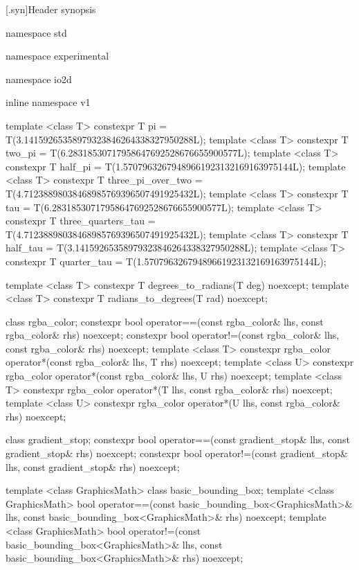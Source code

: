 [\iotwod.syn]{Header  synopsis}

%
%
\begin{codeblock}

namespace std { namespace experimental {
  namespace io2d { inline namespace v1 {
    template <class T>
    constexpr T pi = T(3.14159265358979323846264338327950288L);
    template <class T>
    constexpr T two_pi = T(6.28318530717958647692528676655900577L);
    template <class T>
    constexpr T half_pi = T(1.57079632679489661923132169163975144L);
    template <class T>
    constexpr T three_pi_over_two = T(4.71238898038468985769396507491925432L);
    template <class T>
    constexpr T tau = T(6.28318530717958647692528676655900577L);
    template <class T>
    constexpr T three_quarters_tau = T(4.71238898038468985769396507491925432L);
    template <class T>
    constexpr T half_tau = T(3.14159265358979323846264338327950288L);
    template <class T>
    constexpr T quarter_tau = T(1.57079632679489661923132169163975144L);
    
    template <class T>
    constexpr T degrees_to_radians(T deg) noexcept;
    template <class T>
    constexpr T radians_to_degrees(T rad) noexcept;

    class rgba_color;
    constexpr bool operator==(const rgba_color& lhs, const rgba_color& rhs) 
      noexcept;
    constexpr bool operator!=(const rgba_color& lhs, const rgba_color& rhs) 
      noexcept;
    template <class T>
    constexpr rgba_color operator*(const rgba_color& lhs, T rhs) noexcept;
    template <class U>
    constexpr rgba_color operator*(const rgba_color& lhs, U rhs) noexcept;
    template <class T>
    constexpr rgba_color operator*(T lhs, const rgba_color& rhs) noexcept;
    template <class U>
    constexpr rgba_color operator*(U lhs, const rgba_color& rhs) noexcept;
  
    class gradient_stop;
    constexpr bool operator==(const gradient_stop& lhs,
      const gradient_stop& rhs) noexcept;
    constexpr bool operator!=(const gradient_stop& lhs,
      const gradient_stop& rhs) noexcept;
  
    template <class GraphicsMath>
    class basic_bounding_box;
    template <class GraphicsMath>
    bool operator==(const basic_bounding_box<GraphicsMath>& lhs,
      const basic_bounding_box<GraphicsMath>& rhs) noexcept;
    template <class GraphicsMath>
    bool operator!=(const basic_bounding_box<GraphicsMath>& lhs,
      const basic_bounding_box<GraphicsMath>& rhs) noexcept;
  
}}}}
\end{codeblock}
